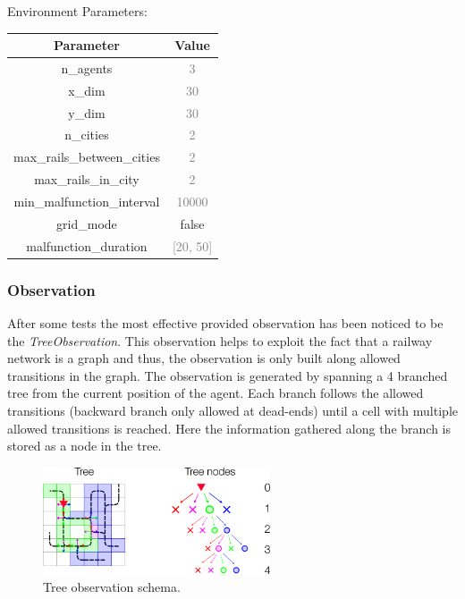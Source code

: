 \documentclass[12pt]{article}
\begin{document}
Environment Parameters:
\begin{center}
\begin{tabular}{ |c|c| } 
    \hline
\textbf{Parameter} & \textbf{Value} \\ 
    \hline
\textcolor{BrickRed}{n\_agents} & \textcolor{gray}{3} \\ 
    \hline
\textcolor{BrickRed}{x\_dim} & \textcolor{gray}{30}\\ 
    \hline
\textcolor{BrickRed}{y\_dim} & \textcolor{gray}{30}\\ 
    \hline
\textcolor{BrickRed}{n\_cities} & \textcolor{gray}{2}\\ 
    \hline
\textcolor{BrickRed}{ max\_rails\_between\_cities} & \textcolor{gray}{2}\\ 
    \hline
\textcolor{BrickRed}{max\_rails\_in\_city} & \textcolor{gray}{2}\\ 
    \hline
\textcolor{BrickRed}{min\_malfunction\_interval} & \textcolor{gray}{10000}\\ 
    \hline
\textcolor{BrickRed}{grid\_mode} & \textcolor{OliveGreen}{false}\\ 
    \hline
\textcolor{BrickRed}{malfunction\_duration} & \textcolor{gray}{[20, 50]}\\ 
\hline
\end{tabular}
\end{center}

\subsubsection{Observation}

After some tests the most effective provided observation has been noticed to be the \textit{TreeObservation}.
This observation helps to exploit the fact that a railway network is a graph and thus, the observation is only built along allowed transitions in the graph. The observation is generated by spanning a 4 branched tree from the current position of the agent. Each branch follows the allowed transitions (backward branch only allowed at dead-ends) until a cell with multiple allowed transitions is reached. Here the information gathered along the branch is stored as a node in the tree.

\begin{figure}[H]
\centering
\includegraphics[width=0.6\textwidth]{res/tree_obs.png}
\caption{\label{fig:Views}Tree observation schema.}
\end{figure}
\end{document}

